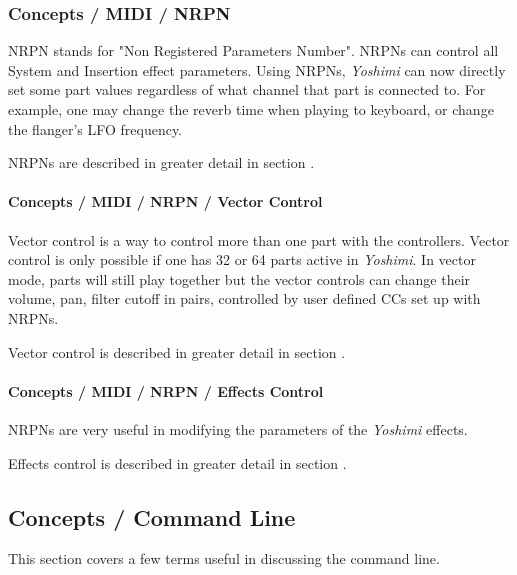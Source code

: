 \subsubsection{Concepts / MIDI / NRPN}
\label{subsubsec:concepts_midi_nrpn}

   NRPN stands for "Non Registered Parameters Number".
   NRPNs can control all System and Insertion effect parameters.
   Using NRPNs, \textsl{Yoshimi} can now directly set some part values
   regardless of what channel that part is connected to.  For example, one
   may change the reverb time when playing to keyboard, or
   change the flanger's LFO frequency.

   NRPNs are described in greater detail in section
   .

\paragraph{Concepts / MIDI / NRPN / Vector Control}
\label{paragraph:concepts_midi_nrpn_vector_control}

   Vector control is a way to control more than one part with the
   controllers.
   Vector control is only possible if one has 32 or 64 parts active 
   in \textsl{Yoshimi}.
   In vector mode, parts will still play together but the vector controls can
   change their volume, pan, filter cutoff in pairs, controlled by user
   defined CCs set up with NRPNs.

   Vector control is described in greater detail in section
   .

\paragraph{Concepts / MIDI / NRPN / Effects Control}
\label{paragraph:concepts_midi_nrpn_effects_control}

   NRPNs are very useful in modifying the parameters of the
   \textsl{Yoshimi} effects.

   Effects control is described in greater detail in section
   .

\subsection{Concepts / Command Line}
\label{subsec:concepts_command_line}

   This section covers a few terms useful in discussing the command line.

